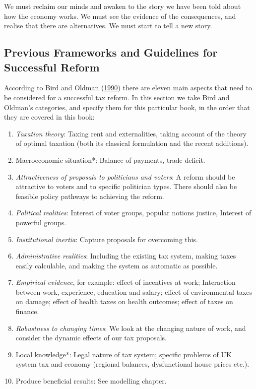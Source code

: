 \documentclass[]{tufte-handout}
\providecommand{\tightlist}{%
  \setlength{\itemsep}{0pt}\setlength{\parskip}{0pt}}
\begin{document}
We must reclaim our minds and awaken to the story we have been told
about how the economy works. We must see the evidence of the
consequences, and realise that there are alternatives. We must start to
tell a new story.

\hypertarget{previous-frameworks-and-guidelines-for-successful-reform}{%
\subsection{Previous Frameworks and Guidelines for Successful
Reform}\label{previous-frameworks-and-guidelines-for-successful-reform}}

According to Bird and Oldman
(\protect\hyperlink{ref-BirdAndOldman}{1990}) there are eleven main
aspects that need to be considered for a successful tax reform. In this
section we take Bird and Oldman's categories, and specify them for this
particular book, in the order that they are covered in this book:

\begin{enumerate}
\def\labelenumi{\arabic{enumi}.}
\tightlist
\item
  \emph{Taxation theory}: Taxing rent and externalities, taking account
  of the theory of optimal taxation (both its classical formulation and
  the recent additions).\\
\item
  Macroeconomic situation*: Balance of payments, trade deficit.\\
\item
  \emph{Attractiveness of proposals to politicians and voters}: A reform
  should be attractive to voters and to specific politician types. There
  should also be feasible policy pathways to achieving the reform.
\item
  \emph{Political realities}: Interest of voter groups, popular notions
  justice, Interest of powerful groups.
\item
  \emph{Institutional inertia}: Capture proposals for overcoming this.\\
\item
  \emph{Administrative realities}: Including the existing tax system,
  making taxes easily calculable, and making the system as automatic as
  possible.\\
\item
  \emph{Empirical evidence}, for example: effect of incentives at work;
  Interaction between work, experience, education and salary; effect of
  environmental taxes on damage; effect of health taxes on health
  outcomes; effect of taxes on finance.\\
\item
  \emph{Robustness to changing times}: We look at the changing nature of
  work, and consider the dynamic effects of our tax proposals.
\item
  Local knowledge*: Legal nature of tax system; specific problems of UK
  system tax and economy (regional balances, dysfunctional house prices
  etc.).\\
\item
  Produce beneficial results: See modelling chapter.
\end{enumerate}
\end{document}
